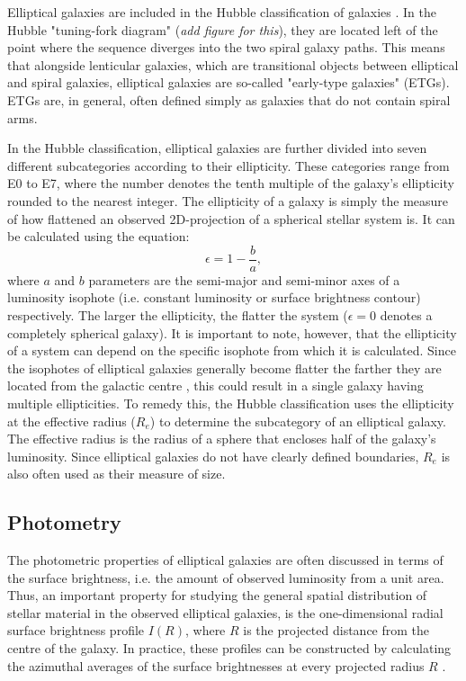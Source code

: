 \documentclass[english, oneside]{HYgradu}
\begin{document}
Elliptical galaxies are included in the Hubble classification of galaxies \citep{Hubble1926}. In the Hubble "tuning-fork diagram" (\textit{add figure for this}), they are located left of the point where the sequence diverges into the two spiral galaxy paths. This means that alongside lenticular galaxies, which are transitional objects between elliptical and spiral galaxies, elliptical galaxies are so-called "early-type galaxies" (ETGs). ETGs are, in general, often defined simply as galaxies that do not contain spiral arms.

In the Hubble classification, elliptical galaxies are further divided into seven different subcategories according to their ellipticity. These categories range from E0 to E7, where the number denotes the tenth multiple of the galaxy's ellipticity rounded to the nearest integer. The ellipticity of a galaxy is simply the measure of how flattened an observed 2D-projection of a spherical stellar system is. It can be calculated using the equation:
\begin{equation}
\epsilon = 1 - \frac{b}{a},
\end{equation}
where $a$ and $b$ parameters are the semi-major and semi-minor axes of a luminosity isophote (i.e. constant luminosity or surface brightness contour) respectively. The larger the ellipticity, the flatter the system ($\epsilon = 0$ denotes a completely spherical galaxy). It is important to note, however, that the ellipticity of a system can depend on the specific isophote from which it is calculated. Since the isophotes of elliptical galaxies generally become flatter the farther they are located from the galactic centre \citep{BinneyTremaine}, this could result in a single galaxy having multiple ellipticities. To remedy this, the Hubble classification uses the ellipticity at the effective radius ($R_e$) to determine the subcategory of an elliptical galaxy. The effective radius is the radius of a sphere that encloses half of the galaxy's luminosity. Since elliptical galaxies do not have clearly defined boundaries, $R_e$ is also often used as their measure of size. 

\subsection{Photometry} \label{section:ellip_photo}

The photometric properties of elliptical galaxies are often discussed in terms of the surface brightness, i.e. the amount of observed luminosity from a unit area. Thus, an important property for studying the general spatial distribution of stellar material in the observed elliptical galaxies, is the one-dimensional radial surface brightness profile $I(R)$, where $R$ is the projected distance from the centre of the galaxy. In practice, these profiles can be constructed by calculating the azimuthal averages of the surface brightnesses at every projected radius $R$ \citep{MerrittBook}.
\end{document}
